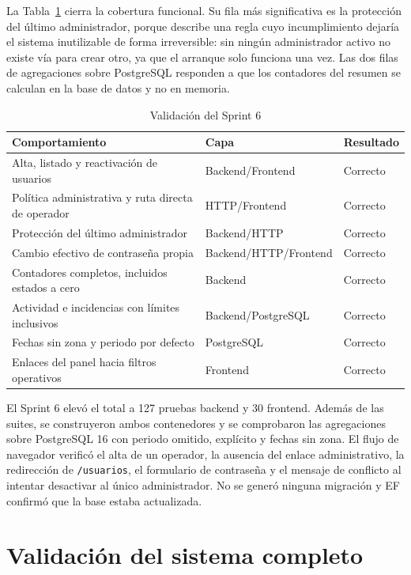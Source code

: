 La Tabla~\ref{tab:val-s6} cierra la cobertura funcional. Su fila más significativa es la protección del último administrador, porque describe una regla cuyo incumplimiento dejaría el sistema inutilizable de forma irreversible: sin ningún administrador activo no existe vía para crear otro, ya que el arranque solo funciona una vez. Las dos filas de agregaciones sobre PostgreSQL responden a que los contadores del resumen se calculan en la base de datos y no en memoria.

\begin{table}[htbp]
\centering
\caption{Validación del Sprint 6}
\label{tab:val-s6}
\begin{tabular}{p{6.1cm}p{2.2cm}p{2.3cm}}
\hline Comportamiento & Capa & Resultado \\ \hline
Alta, listado y reactivación de usuarios & Backend/\allowbreak Frontend & Correcto \\
Política administrativa y ruta directa de operador & HTTP/\allowbreak Frontend & Correcto \\
Protección del último administrador & Backend/\allowbreak HTTP & Correcto \\
Cambio efectivo de contraseña propia & Backend/\allowbreak HTTP/\allowbreak Frontend & Correcto \\
Contadores completos, incluidos estados a cero & Backend & Correcto \\
Actividad e incidencias con límites inclusivos & Backend/\allowbreak PostgreSQL & Correcto \\
Fechas sin zona y periodo por defecto & PostgreSQL & Correcto \\
Enlaces del panel hacia filtros operativos & Frontend & Correcto \\
\hline
\end{tabular}
\end{table}

El Sprint 6 elevó el total a 127 pruebas backend y 30 frontend. Además de las suites, se construyeron ambos contenedores y se comprobaron las agregaciones sobre PostgreSQL 16 con periodo omitido, explícito y fechas sin zona. El flujo de navegador verificó el alta de un operador, la ausencia del enlace administrativo, la redirección de \texttt{/usuarios}, el formulario de contraseña y el mensaje de conflicto al intentar desactivar al único administrador. No se generó ninguna migración y EF confirmó que la base estaba actualizada.

\section{Validación del sistema completo}

